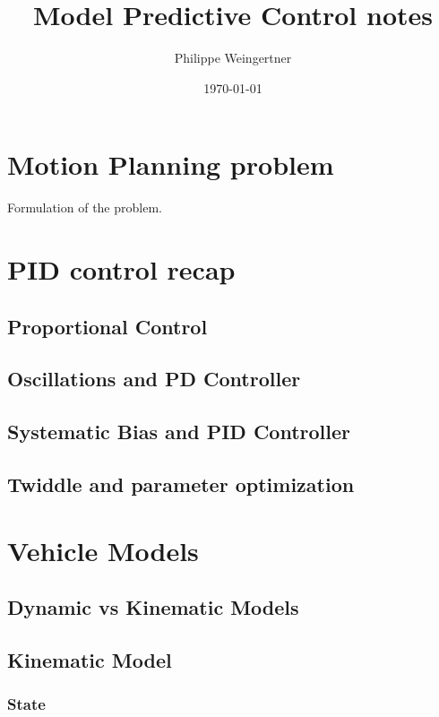 \documentclass[11pt]{article}
\begin{document}
\title{Model Predictive Control notes}
\author{Philippe Weingertner}
\date{\today}
\maketitle

\section{Motion Planning problem}

Formulation of the problem.

\section{PID control recap}

\subsection{Proportional Control}

\subsection{Oscillations and PD Controller}

\subsection{Systematic Bias and PID Controller}

\subsection{Twiddle and parameter optimization}

\section{Vehicle Models}

\subsection{Dynamic vs Kinematic Models}

\subsection{Kinematic Model}

\subsubsection{State}
\end{document}

